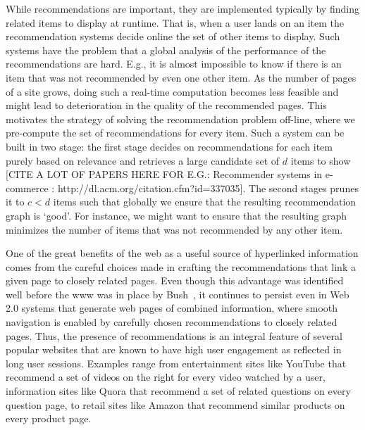 While recommendations are important, they are implemented typically by finding
related items to display at runtime. That is, when a user lands on an item the
recommendation systems decide online the set of other items to display. Such
systems have the problem that a global analysis of the performance of the
recommendations are hard. E.g., it is almost impossible to know if there is an
item that was not recommended by even one other item. As the number of
pages of a site grows, doing such a real-time computation becomes less feasible and
might lead to deterioration in the quality of the recommended pages.  This
motivates the strategy of solving the recommendation problem off-line, where we
pre-compute the set of recommendations for every item. Such a system can be
built in two stage: the first stage decides on recommendations for each item
purely based on relevance and retrieves a large candidate set of $d$ items to
show [CITE A LOT OF PAPERS HERE FOR E.G.: Recommender systems in e-commerce
: http://dl.acm.org/citation.cfm?id=337035]. 
The second stages prunes it to $c < d$ items such that globally we ensure
that the resulting recommendation graph is `good'. For instance, we might want
to ensure that the resulting graph minimizes the number of items that was not
recommended by any other item. \vs

One of the great benefits of the web as a useful source of hyperlinked
information comes from the careful choices made in crafting the recommendations
that link a given page to closely related pages. Even though this advantage was
identified well before the www was in place by Bush~\cite{Bush45}, it continues
to persist even in Web 2.0 systems that generate web pages of combined
information, where smooth navigation is enabled by carefully chosen
recommendations to closely related pages. Thus, the presence of recommendations
is an integral feature of several popular websites that are known to have high
user engagement as reflected in long user sessions. Examples range from 
entertainment sites like YouTube that recommend a set of videos on the right
for every video watched by a user, information sites like Quora that recommend
a set of related questions on every question page, to retail sites like Amazon
that recommend similar products on every product page. \vs


